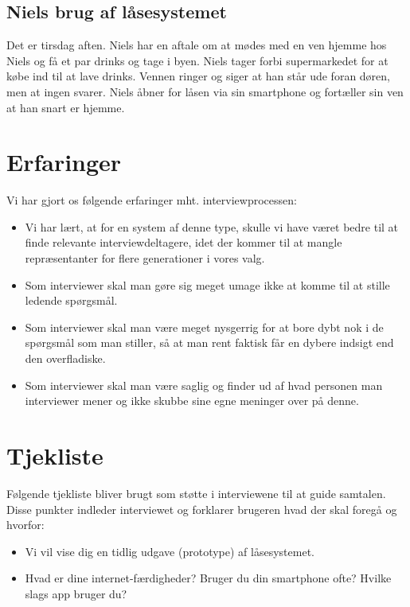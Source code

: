 \documentclass[a4paper,12pt]{article}
\begin{document}
\subsection{Niels brug af låsesystemet}
Det er tirsdag aften. Niels har en aftale om at mødes med en ven hjemme hos Niels og få et par drinks og tage i byen. Niels tager forbi supermarkedet for at købe ind til at lave drinks. Vennen ringer og siger at han står ude foran døren, men at ingen svarer. Niels åbner for låsen via sin smartphone og fortæller sin ven at han snart er hjemme.

\section{Erfaringer}
Vi har gjort os følgende erfaringer mht. interviewprocessen:
\begin{itemize}
    \item Vi har lært, at for en system af denne type, skulle vi have været bedre til at finde relevante interviewdeltagere, idet der kommer til at mangle repræsentanter for flere generationer i vores valg.
    \item Som interviewer skal man gøre sig meget umage ikke at komme til at stille ledende spørgsmål.
    \item Som interviewer skal man være meget nysgerrig for at bore dybt nok i de spørgsmål som man stiller, så at man rent faktisk får en dybere indsigt end den overfladiske.
    \item Som interviewer skal man være saglig og finder ud af hvad personen man interviewer mener og ikke skubbe sine egne meninger over på denne.
\end{itemize}


\newpage 
\appendix
\section{Tjekliste}
Følgende tjekliste bliver brugt som støtte i interviewene til at guide samtalen. \\
Disse punkter indleder interviewet og forklarer brugeren hvad der skal foregå og hvorfor:

\begin{itemize}
    \item Vi vil vise dig en tidlig udgave (prototype) af låsesystemet.
    \item Hvad er dine internet-færdigheder? Bruger du din smartphone ofte? Hvilke slags app bruger du?
\end{itemize}
\end{document}
